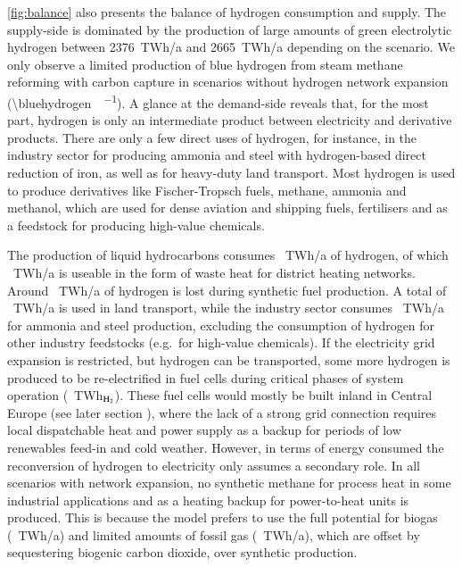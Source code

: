 \cref{fig:balance} also presents the balance of hydrogen consumption and supply.
The supply-side is dominated by the production of large amounts of green
electrolytic hydrogen between 2376~TWh/a and 2665~TWh/a depending on the
scenario. We only observe a limited production of blue hydrogen from steam
methane reforming with carbon capture in scenarios without hydrogen network
expansion (\SI{\bluehydrogen}{\twh\per\year}). A glance at the demand-side
reveals that, for the most part, hydrogen is only an intermediate product
between electricity and derivative products. There are only a few direct uses of
hydrogen, for instance, in the industry sector for producing ammonia and steel
with hydrogen-based direct reduction of iron, as well as for heavy-duty land
transport. Most hydrogen is used to produce derivatives like Fischer-Tropsch
fuels, methane, ammonia and methanol, which are used for dense aviation and
shipping fuels, fertilisers and as a feedstock for producing high-value
chemicals.

The production of liquid hydrocarbons consumes \ptlhydrogenusage~TWh/a of
hydrogen, of which \ptlwasteheat~TWh/a is useable in the form of waste heat for
district heating networks. Around \hydrogenlosses~TWh/a of hydrogen is lost
during synthetic fuel production. A total of \hydrogentransportdemand~TWh/a is
used in land transport, while the industry sector consumes
\hydrogenindustrydemand~TWh/a for ammonia and steel production, excluding the
consumption of hydrogen for other industry feedstocks (e.g.~for high-value
chemicals).  If the electricity grid expansion is restricted, but hydrogen can
be transported, some more hydrogen is produced to be re-electrified in fuel
cells during critical phases of system operation
(\hydrogenfuelcell~TWh$_{\ce{H2}}$). These fuel cells would mostly be built
inland in Central Europe (see later section ), where the lack of
a strong grid connection requires local dispatchable heat and power supply as a
backup for periods of low renewables feed-in and cold weather. However, in terms
of energy consumed the reconversion of hydrogen to electricity only assumes a
secondary role. In all scenarios with network expansion, no synthetic methane
for process heat in some industrial applications and as a heating backup for
power-to-heat units is produced. This is because the model prefers to use the
full potential for biogas (\biogas~TWh/a) and limited amounts of fossil gas
(\fossilgas~TWh/a), which are offset by sequestering biogenic carbon dioxide,
over synthetic production.

